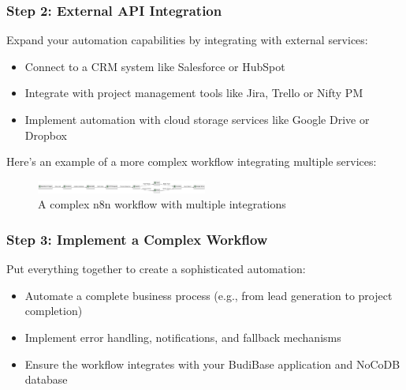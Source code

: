 \subsubsection{Step 2: External API Integration}
Expand your automation capabilities by integrating with external services:

\begin{itemize}
    \item Connect to a CRM system like Salesforce or HubSpot
    \item Integrate with project management tools like Jira,  Trello or Nifty PM
    \item Implement automation with cloud storage services like Google Drive or Dropbox
\end{itemize}

Here's an example of a more complex workflow integrating multiple services:


\begin{figure}
    \centering
    \includegraphics[width=0.5\textwidth]{figures/09-complex-n8n-workflow}
    \caption{A complex n8n workflow with multiple integrations}
    \label{fig:complex-n8n-workflow}
\end{figure}

\subsubsection{Step 3: Implement a Complex Workflow}
Put everything together to create a sophisticated automation:

\begin{itemize}
    \item Automate a complete business process (e.g., from lead generation to project completion)
    \item Implement error handling, notifications, and fallback mechanisms
    \item Ensure the workflow integrates with your BudiBase application and NoCoDB database
\end{itemize}


